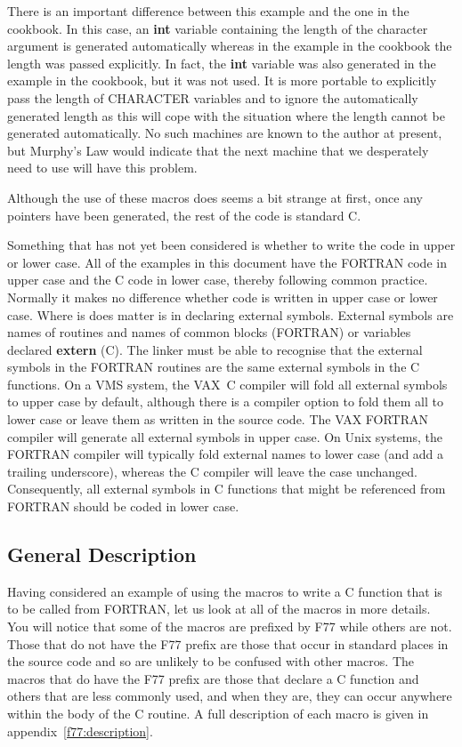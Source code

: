 There is an important difference between this example and the one in the
cookbook. In this case, an {\bf int} variable containing the length of the
character argument is generated automatically whereas in the example in the
cookbook the length was passed explicitly. In fact, the {\bf int} variable was
also generated in the example in the cookbook, but it was not used. It is more
portable to explicitly pass the length of CHARACTER variables and to ignore
the automatically generated length as this will cope with the situation where
the length cannot be generated automatically. No such machines are known to the
author at present, but Murphy's Law would indicate that the next machine that
we desperately need to use will have this problem.

Although the use of these macros does seems a bit strange at first, once any
pointers have been generated, the rest of the code is standard C.

Something that has not yet been considered is whether to write the code in
upper or lower case. All of the examples in this document have the FORTRAN code
in upper case and the C code in lower case, thereby following common practice.
Normally it makes no difference whether code is written in upper case or lower
case. Where is does matter is in declaring external symbols. External symbols
are names of routines and names of common blocks (FORTRAN) or variables
declared {\bf extern} (C). The linker must be able to recognise that the
external symbols in the FORTRAN routines are the same external symbols in the C
functions. On a VMS system, the VAX~C compiler will fold all external symbols
to upper case by default, although there is a compiler option to fold them all
to lower case or leave them as written in the source code. The VAX FORTRAN
compiler will generate all external symbols in upper case. On Unix systems, the
FORTRAN compiler will typically fold external names to lower case (and add a
trailing underscore), whereas the C compiler will leave the case unchanged.
Consequently, all external symbols in C functions that might be referenced from
FORTRAN should be coded in lower case.

\subsection{General Description}

Having considered an example of using the macros to write a C function that is
to be called from FORTRAN, let us look at all of the macros in more details.
You will notice that some of the macros are prefixed by F77 while others are
not. Those that do not have the F77 prefix are those that occur in standard
places in the source code and so are unlikely to be confused with other macros.
The macros that do have the F77 prefix are those that declare a C function and
others that are less commonly used, and when they are, they can occur anywhere
within the body of the C routine. A full description of each macro is given in
appendix~\ref{f77:description}.

